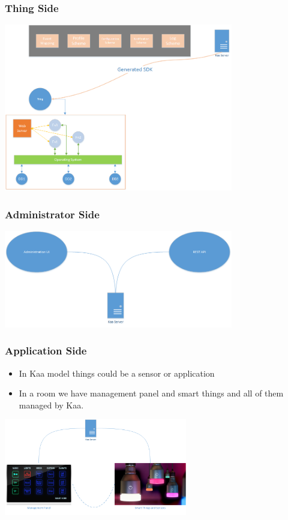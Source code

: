 \documentclass{beamer}
\begin{document}
\begin{frame}
	\frametitle{Thing Side}
	\centering\includegraphics[width=10cm]{diags/kaa-arch-2.png}
\end{frame}

\begin{frame}
	\frametitle{Administrator Side}
	\centering\includegraphics[width=10cm]{diags/kaa-arch-3.png}
\end{frame}

\begin{frame}
	\frametitle{Application Side}
	\begin{itemize}
		\item In Kaa model things could be a \textcolor{TextOrange}{sensor} or \textcolor{TextGreen}{application}
		\item In a room we have management panel and smart things and all of them
			managed by Kaa.
	\end{itemize}
	\centering\includegraphics[width=8cm]{diags/kaa-arch-4.png}
\end{frame}
\end{document}
